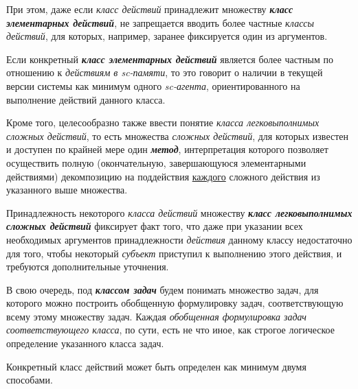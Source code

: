 При этом, даже если \textit{класс действий} принадлежит множеству \textbf{\textit{класс элементарных действий}}, не запрещается вводить более частные \textit{классы действий}, для которых, например, заранее фиксируется один из аргументов.

Если конкретный \textbf{\textit{класс элементарных действий}} является более частным по отношению к \textit{действиям в sc-памяти}, то это говорит о наличии в текущей версии системы как минимум одного \textit{sc-агента}, ориентированного на выполнение действий данного класса.

Кроме того, целесообразно также ввести понятие \textit{класса легковыполнимых сложных действий}, то есть множества \textit{сложных действий}, для которых известен и доступен по крайней мере один \textbf{\textit{метод}}, интерпретация которого позволяет осуществить полную (окончательную, завершающуюся элементарными действиями) декомпозицию на поддействия \underline{каждого} сложного действия из указанного выше множества.

Принадлежность некоторого \textit{класса действий} множеству \textbf{\textit{класс легковыполнимых сложных действий}} фиксирует факт того, что даже при указании всех необходимых аргументов принадлежности \textit{действия} данному классу недостаточно для того, чтобы некоторый \textit{субъект} приступил к выполнению этого действия, и требуются дополнительные уточнения.

В свою очередь, под \textbf{\textit{классом задач}} будем понимать множество задач, для которого можно построить обобщенную формулировку задач, соответствующую всему этому множеству задач. Каждая \textit{обобщенная формулировка задач соответствующего класса}, по сути, есть не что иное, как строгое логическое определение указанного класса задач.

\begin{SCn}
\end{SCn}

Конкретный класс действий может быть определен как минимум двумя способами.

\begin{SCn}

	\begin{scnsubdividing}
		\begin{scnindent}
		\end{scnindent}
	\end{scnsubdividing}
\end{SCn}

